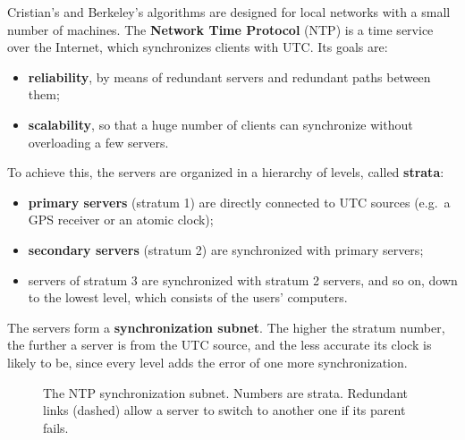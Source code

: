 Cristian's and Berkeley's algorithms are designed for local networks with a small number of machines. The \textbf{Network Time Protocol} (NTP) is a time service over the Internet, which synchronizes clients with UTC. Its goals are:
\begin{itemize}
  \item \textbf{reliability}, by means of redundant servers and redundant paths between them;
  \item \textbf{scalability}, so that a huge number of clients can synchronize without overloading a few servers.
\end{itemize}

To achieve this, the servers are organized in a hierarchy of levels, called \textbf{strata}:
\begin{itemize}
  \item \textbf{primary servers} (stratum 1) are directly connected to UTC sources (e.g.\ a GPS receiver or an atomic clock);
  \item \textbf{secondary servers} (stratum 2) are synchronized with primary servers;
  \item servers of stratum 3 are synchronized with stratum 2 servers, and so on, down to the lowest level, which consists of the users' computers.
\end{itemize}
The servers form a \textbf{synchronization subnet}. The higher the stratum number, the further a server is from the UTC source, and the less accurate its clock is likely to be, since every level adds the error of one more synchronization.

\begin{figure}[H]
  \centering
  \caption{The NTP synchronization subnet. Numbers are strata. Redundant links (dashed) allow a server to switch to another one if its parent fails.}
  \label{fig:ntp}
\end{figure}
